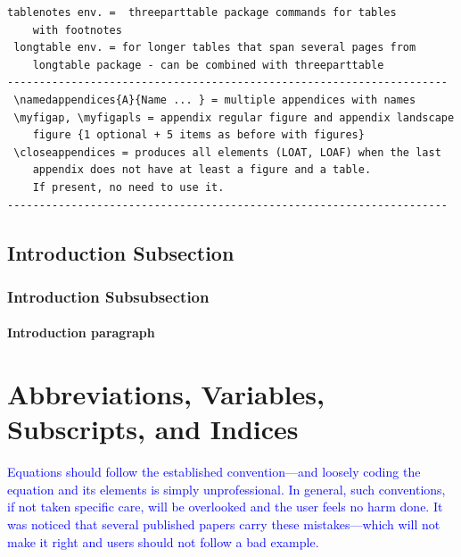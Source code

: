 \documentclass[phd]{ndsu-thesis-2022}
\newcommand\italk[1]{\textcolor{blue}{#1}}  %
\begin{document}
\begin{lstlisting}[basicstyle=\ttfamily\footnotesize\color{blue}]
 tablenotes env. =  threeparttable package commands for tables 
 	with footnotes 
 longtable env. = for longer tables that span several pages from 
 	longtable package - can be combined with threeparttable 
---------------------------------------------------------------------
 \namedappendices{A}{Name ... } = multiple appendices with names 
 \myfigap, \myfigapls = appendix regular figure and appendix landscape 
 	figure {1 optional + 5 items as before with figures}
 \closeappendices = produces all elements (LOAT, LOAF) when the last 
 	appendix does not have at least a figure and a table. 
	If present, no need to use it.
---------------------------------------------------------------------
\end{lstlisting}

\subsection{Introduction Subsection}
\kant[4]

\subsubsection{Introduction Subsubsection}
\kant[6]

\paragraph{Introduction paragraph}
\kant[8]


\section{Abbreviations, Variables, Subscripts, and Indices}
\italk{Equations should follow the established convention---and loosely coding the equation and its elements is simply unprofessional. In general, such conventions, if not taken specific care, will be overlooked and the user feels no harm done. It was noticed that several published papers carry these mistakes---which will not make it right and users should not follow a bad example.}
\end{document}
